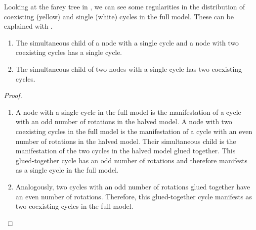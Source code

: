 
Looking at the farey tree in , we can see some regularities in the distribution of coexisting (yellow) and single (white) cycles in the full model.
These can be explained with .

\begin{theorem}
	\begin{enumerate}
		\item The simultaneous child of a node with a single cycle and a node with two coexisting cycles has a single cycle.
		\item The simultaneous child of two nodes with a single cycle has two coexisting cycles.
	\end{enumerate}
\end{theorem}

\begin{proof}
	\begin{enumerate}
		\item A node with a single cycle in the full model is the manifestation of a cycle with an odd number of rotations in the halved model.
		      A node with two coexisting cycles in the full model is the manifestation of a cycle with an even number of rotations in the halved model.
		      Their simultaneous child is the manifestation of the two cycles in the halved model glued together.
		      This glued-together cycle has an odd number of rotations and therefore manifests as a single cycle in the full model.
		\item Analogously, two cycles with an odd number of rotations glued together have an even number of rotations.
		      Therefore, this glued-together cycle manifests as two coexisting cycles in the full model.
	\end{enumerate}
\end{proof}
